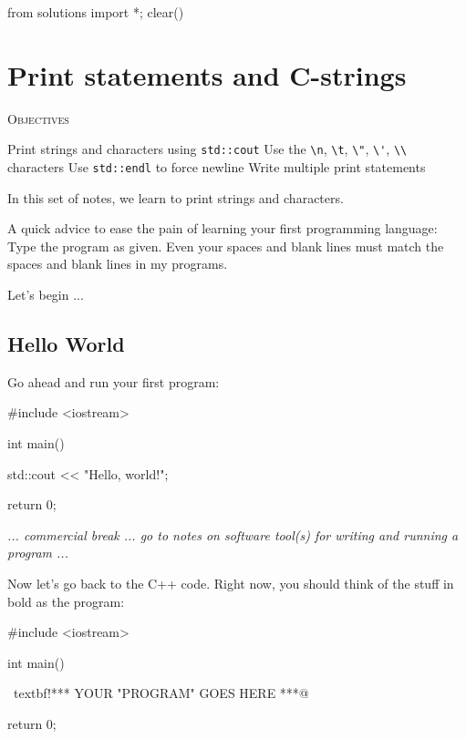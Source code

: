 \begin{python0}
from solutions import *; clear()
\end{python0}
\chapter{Print statements and C-strings}


\textsc{Objectives}
\begin{tightlist}
\li Print strings and characters using \verb!std::cout!
\li Use the \verb!\n!, \verb!\t!, \verb!\"!, \verb!\'!, 
    \verb!\\! characters
\li Use \verb!std::endl! to force newline
\li Write multiple print statements
\end{tightlist}

In this set of notes, we learn to print strings and characters.

A quick advice to ease the pain of learning your first programming language: 
Type the program  as given. 
Even your spaces and blank lines must match the spaces  and blank lines in my programs.

Let's begin ...


\newpage\section{Hello World}

Go ahead and run your first program:
\begin{console}
#include <iostream>

int main()
{
    std::cout << "Hello, world!\n";

    return 0;
}
\end{console}

{\it ... commercial break ... go to notes on software tool(s) for writing and  running a program ...}

Now let's go back to the C++ code. Right now, you should think of the stuff in bold as the program:
\begin{console}[commandchars=\~\!\@]
#include <iostream>

int main()
{
    ~textbf!*** YOUR "PROGRAM" GOES HERE ***@

    return 0;
}
\end{console}


